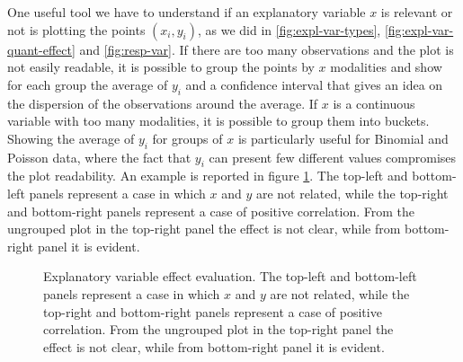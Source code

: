 \documentclass[a4paper, nobind]{templates/ociamthesis}
\theoremstyle{definition}
\theoremstyle{definition}
\theoremstyle{definition}
\theoremstyle{remark}
\begin{document}
One useful tool we have to understand if an explanatory variable \(x\) is relevant or not is plotting the points \((x_i, y_i)\), as we did in \ref{fig:expl-var-types}, \ref{fig:expl-var-quant-effect} and \ref{fig:resp-var}. If there are too many observations and the plot is not easily readable, it is possible to group the points by \(x\) modalities and show for each group the average of \(y_i\) and a confidence interval that gives an idea on the dispersion of the observations around the average. If \(x\) is a continuous variable with too many modalities, it is possible to group them into buckets. Showing the average of \(y_i\) for groups of \(x\) is particularly useful for Binomial and Poisson data, where the fact that \(y_i\) can present few different values compromises the plot readability. An example is reported in figure \ref{fig:var-selection}. The top-left and bottom-left panels represent a case in which \(x\) and \(y\) are not related, while the top-right and bottom-right panels represent a case of positive correlation. From the ungrouped plot in the top-right panel the effect is not clear, while from bottom-right panel it is evident.







\begin{figure}[!hbtp]

{\centering {}\newline{}

}

\caption[Explanatory variable effect evaluation.]{Explanatory variable effect evaluation. The top-left and bottom-left panels represent a case in which \(x\) and \(y\) are not related, while the top-right and bottom-right panels represent a case of positive correlation. From the ungrouped plot in the top-right panel the effect is not clear, while from bottom-right panel it is evident.}\label{fig:var-selection}
\end{figure}
\end{document}
